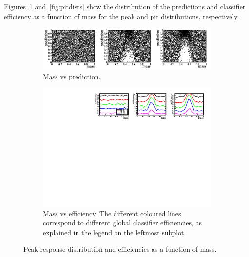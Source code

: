 Figures~\ref{fig:peakdists} and~\ref{fig:pitdists} show the distribution of the predictions
and classifier efficiency as a function of mass for the peak and pit distributions, respectively. 
\begin{figure}[h]
\centering
		\begin{subfigure}[b]{0.95\textwidth}
			\includegraphics[width=\textwidth]{graphs/PeakDistributions.png}
			\caption{Mass vs prediction.}
		\end{subfigure}
		\begin{subfigure}[b]{0.95\textwidth}
			\includegraphics[width=\textwidth]{graphs/PeakEffs.pdf}
			\caption{Mass vs efficiency. The different coloured lines correspond to
				different global classifier efficiencies, as explained in the legend on the leftmost subplot.}
		\end{subfigure}
		\caption{Peak response distribution and efficiencies as a function of mass. \label{fig:peakdists}}
\end{figure}

